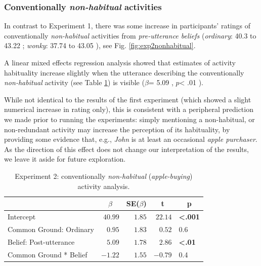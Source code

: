 \documentclass{sp}\usepackage[]{graphicx}\usepackage[]{color}
\begin{document}
\subsubsection{Conventionally \textit{non-habitual} activities}

In contrast to Experiment 1, there was some increase in participants' ratings of conventionally \textit{non-habitual} activities from \textit{pre-utterance beliefs} (\textit{ordinary}: %
40.3
 to %
43.22
; \textit{wonky}: %
37.74
 to %
43.05
), see Fig. \ref{fig:exp2nonhabitual}.

A linear mixed effects regression analysis showed that estimates of activity habituality increase slightly when the utterance describing the conventionally \textit{non-habitual} activity (see Table \ref{tab:exp2nonhabitual}) is visible ($\beta$=%
5.09
, $p$<%
.01
).

While not identical to the results of the first experiment (which showed a slight numerical increase in rating only), this is consistent with a peripheral prediction we made prior to running the experiments: simply mentioning a non-habitual, or non-redundant activity may increase the perception of its habituality, by providing some evidence that, e.g., \textit{John} is at least an occasional \textit{apple purchaser}. As the direction of this effect does not change our interpretation of the results, we leave it aside for future exploration.

\begin{table}[ht]
\caption{Experiment 2: conventionally \textit{non-habitual} (\textit{apple-buying}) activity analysis.\label{tab:exp2nonhabitual}} 
\begin{center}
\begin{tabular}{lrrrl}
\toprule
\multicolumn{1}{l}{}&\multicolumn{1}{c}{$\beta$}&\multicolumn{1}{c}{SE($\beta$)}&\multicolumn{1}{c}{\textbf{t}}&\multicolumn{1}{c}{\textbf{p}}\tabularnewline
\midrule
Intercept&$40.99$&$1.85$&$22.14$&\textbf{\textless .001}\tabularnewline
Common Ground: Ordinary&$ 0.95$&$1.83$&$ 0.52$&0.6\tabularnewline
Belief: Post-utterance&$ 5.09$&$1.78$&$ 2.86$&\textbf{\textless .01}\tabularnewline
Common Ground * Belief&$-1.22$&$1.55$&$-0.79$&0.4\tabularnewline
\bottomrule
\end{tabular}\end{center}
\end{table}
\end{document}
